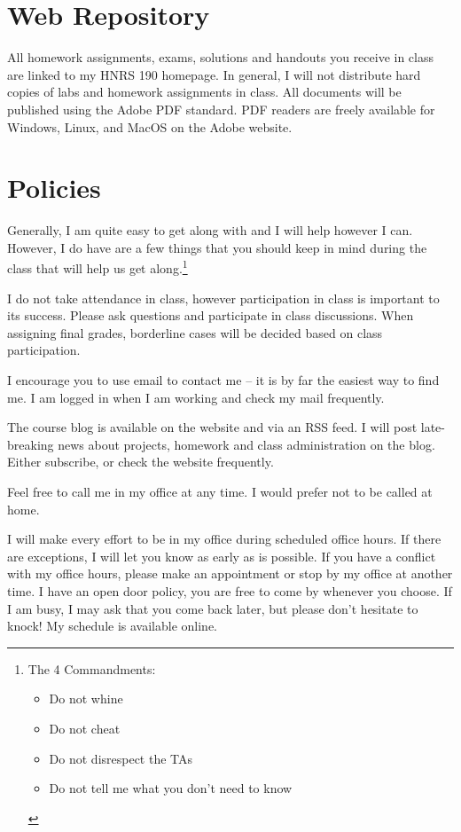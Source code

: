 \documentclass{tufte-handout}
\begin{document}
\section{Web Repository}

All homework assignments, exams, solutions and handouts you receive in
class are linked to my HNRS 190 homepage.
In general, I will not distribute hard copies of labs and homework
assignments in class.  All documents will be published using the Adobe
PDF standard.  PDF readers are freely available for Windows, Linux,
and MacOS on the Adobe website.

\section{Policies}

Generally, I am quite easy to get along with and I will help however I
can.  However, I do have are a few things that you should keep in mind
during the class that will help us get along.\footnote{The 4
  Commandments:
    \begin{itemize}
      \parskip=0pt\itemsep=0pt
    \item Do not whine
    \item Do not cheat
    \item Do not disrespect the TAs
    \item Do not tell me what you don't need to know
    \end{itemize}}

 I do not take attendance in class, however
participation in class is important to its success. Please ask
questions and participate in class discussions. When assigning final
grades, borderline cases will be decided based on class
participation. 

 I encourage you to use email to contact me -- it is
by far the easiest way to find me. I am logged in when I am working
and check my mail frequently.

 The course blog is available on the website and via
an RSS feed.  I will post late-breaking news about projects, homework
and class administration on the blog.  Either subscribe, or check the
website frequently.

 Feel free to call me in my office at any time.  I
would prefer not to be called at home.

 I will make every effort to be in my office
during scheduled office hours. If there are exceptions, I will let you
know as early as is possible. If you have a conflict with my office
hours, please make an appointment or stop by my office at another
time. I have an open door policy, you are free to come by whenever you
choose. If I am busy, I may ask that you come back later, but please
don't hesitate to knock! My schedule is available online.
\end{document}
